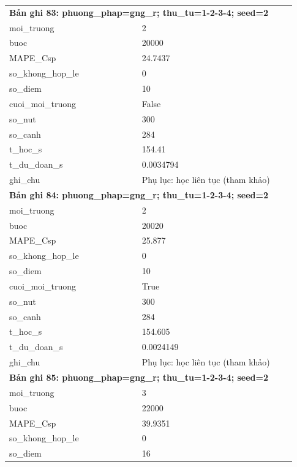 \begin{longtable}{p{0.43\linewidth}p{0.50\linewidth}}
\midrule
\multicolumn{2}{p{0.95\linewidth}}{\textbf{Bản ghi 83: phuong\_phap=gng\_r; thu\_tu=1-2-3-4; seed=2}} \\
moi\_\allowbreak truong & 2 \\
buoc & 20000 \\
MAPE\_\allowbreak Csp & 24.7437 \\
so\_\allowbreak khong\_\allowbreak hop\_\allowbreak le & 0 \\
so\_\allowbreak diem & 10 \\
cuoi\_\allowbreak moi\_\allowbreak truong & False \\
so\_\allowbreak nut & 300 \\
so\_\allowbreak canh & 284 \\
t\_\allowbreak hoc\_\allowbreak s & 154.41 \\
t\_\allowbreak du\_\allowbreak doan\_\allowbreak s & 0.0034794 \\
ghi\_\allowbreak chu & Phụ lục: học liên tục (tham khảo) \\
\midrule
\multicolumn{2}{p{0.95\linewidth}}{\textbf{Bản ghi 84: phuong\_phap=gng\_r; thu\_tu=1-2-3-4; seed=2}} \\
moi\_\allowbreak truong & 2 \\
buoc & 20020 \\
MAPE\_\allowbreak Csp & 25.877 \\
so\_\allowbreak khong\_\allowbreak hop\_\allowbreak le & 0 \\
so\_\allowbreak diem & 10 \\
cuoi\_\allowbreak moi\_\allowbreak truong & True \\
so\_\allowbreak nut & 300 \\
so\_\allowbreak canh & 284 \\
t\_\allowbreak hoc\_\allowbreak s & 154.605 \\
t\_\allowbreak du\_\allowbreak doan\_\allowbreak s & 0.0024149 \\
ghi\_\allowbreak chu & Phụ lục: học liên tục (tham khảo) \\
\midrule
\multicolumn{2}{p{0.95\linewidth}}{\textbf{Bản ghi 85: phuong\_phap=gng\_r; thu\_tu=1-2-3-4; seed=2}} \\
moi\_\allowbreak truong & 3 \\
buoc & 22000 \\
MAPE\_\allowbreak Csp & 39.9351 \\
so\_\allowbreak khong\_\allowbreak hop\_\allowbreak le & 0 \\
so\_\allowbreak diem & 16 \\

\end{longtable}
